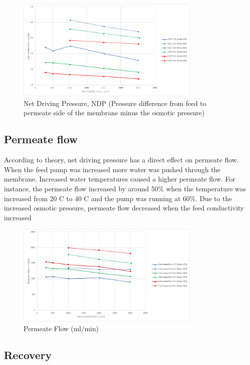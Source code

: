 \begin{figure}[H]
    \centering
    \includegraphics[width=0.8\textwidth]{NDP}
    \caption{Net Driving Pressure, NDP (Pressure difference from feed to permeate side of the membrane minus the osmotic pressure)}
    \label{fig:NDP}
\end{figure}

\subsection{Permeate flow}

According to theory, net driving pressure has a direct effect on permeate flow. When the feed pump was increased more water was pushed through the membrane. Increased water temperatures caused a higher permeate flow. For instance, the permeate flow increased by around 50\% when the temperature was increased from 20 C to 40 C and the pump was running at 60\%. Due to the increased osmotic pressure, permeate flow decreased when the feed conductivity increased

\begin{figure}[H]
    \centering
    \includegraphics[width=0.8\textwidth]{permFlowCurrent}
    \caption{Permeate Flow (ml/min)}
    \label{fig:PermFC}
\end{figure}

\subsection{Recovery}

